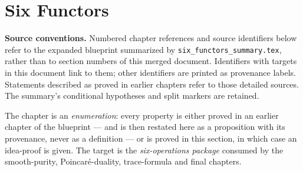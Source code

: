 \documentclass[11pt]{article}
\theoremstyle{plain}
\theoremstyle{definition}
\begin{document}
\section{Six Functors}
\label{sec:six-functors}
\begin{abstract}
content: the six operations, projection formulas, duality, and preservation
of constructible and finite-Tor categories.
\\key theorem: Thm \ref{thm:sf-package}.
\\references: detailed blueprint
\end{abstract}

\noindent\textbf{Source conventions.} Numbered chapter references and source
identifiers below refer to the expanded blueprint summarized by
\nolinkurl{six_functors_summary.tex}, rather than to section numbers of this
merged document. Identifiers with targets in this document link to them;
other identifiers are printed as provenance labels. Statements described
as proved in earlier chapters refer to those detailed sources. The summary's
conditional hypotheses and split markers are retained.

The chapter is an \emph{enumeration}: every property is either proved in an
earlier chapter of the blueprint --- and is then restated here as a proposition
with its provenance, never as a definition --- or is proved in this section, in
which case an idea-proof is given.  The target is the \emph{six-operations
package} consumed by the smooth-purity, Poincar\'e-duality, trace-formula and
final chapters.
\end{document}

